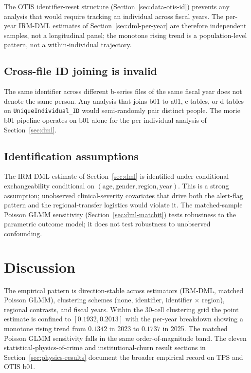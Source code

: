 \documentclass[article,shortnames,nojss]{jss}
\newcommand{\OTIS}{\textsf{OTIS}}
\newcommand{\TPS}{\textsf{TPS}}
\begin{document}
The \OTIS{} identifier-reset structure (Section~\ref{sec:data-otis-id})
prevents any analysis that would require tracking an individual
across fiscal years. The per-year IRM-DML estimates of
Section~\ref{sec:dml-per-year} are therefore independent samples,
not a longitudinal panel; the monotone rising trend is a
population-level pattern, not a within-individual trajectory.

\subsection{Cross-file ID joining is invalid}

The same identifier across different b-series files of the same
fiscal year does not denote the same person. Any analysis that
joins b01 to a01, c-tables, or d-tables on
\texttt{UniqueIndividual\_ID} would semi-randomly pair distinct
people. The morie b01 pipeline operates on b01 alone for the
per-individual analysis of Section~\ref{sec:dml}.

\subsection{Identification assumptions}

The IRM-DML estimate of Section~\ref{sec:dml} is identified under
conditional exchangeability conditional on
$(\mathrm{age}, \mathrm{gender}, \mathrm{region}, \mathrm{year})$.
This is a strong assumption; unobserved clinical-severity covariates
that drive both the alert-flag pattern and the regional-transfer
logistics would violate it. The matched-sample Poisson GLMM
sensitivity (Section~\ref{sec:dml-matchit}) tests robustness to the
parametric outcome model; it does not test robustness to unobserved
confounding.

\section{Discussion}
\label{sec:discussion}

The empirical pattern is direction-stable across estimators
(IRM-DML, matched Poisson GLMM), clustering schemes (none, identifier,
identifier $\times$ region), regional contrasts, and fiscal years.
Within the 30-cell clustering grid the point estimate is confined
to $[0.1932, 0.2013]$ with the per-year breakdown showing a monotone
rising trend from $0.1342$ in 2023 to $0.1737$ in 2025. The matched
Poisson GLMM sensitivity falls in the same order-of-magnitude band.
The eleven statistical-physics-of-crime and institutional-churn
result sections in Section~\ref{sec:physics-results} document the
broader empirical record on \TPS{} and \OTIS{} b01.
\end{document}
